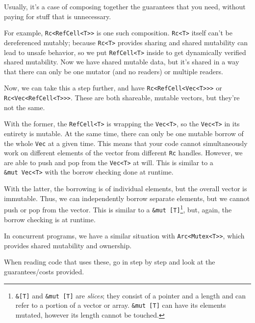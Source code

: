 \documentclass[a4paper,]{book}
\begin{document}
Usually, it's a case of composing together the guarantees that you need,
without paying for stuff that is unnecessary.

For example,
\texttt{Rc\textless{}RefCell\textless{}T\textgreater{}\textgreater{}} is
one such composition. \texttt{Rc\textless{}T\textgreater{}} itself can't
be dereferenced mutably; because \texttt{Rc\textless{}T\textgreater{}}
provides sharing and shared mutability can lead to unsafe behavior, so
we put \texttt{RefCell\textless{}T\textgreater{}} inside to get
dynamically verified shared mutability. Now we have shared mutable data,
but it's shared in a way that there can only be one mutator (and no
readers) or multiple readers.

Now, we can take this a step further, and have
\texttt{Rc\textless{}RefCell\textless{}Vec\textless{}T\textgreater{}\textgreater{}\textgreater{}}
or
\texttt{Rc\textless{}Vec\textless{}RefCell\textless{}T\textgreater{}\textgreater{}\textgreater{}}.
These are both shareable, mutable vectors, but they're not the same.

With the former, the \texttt{RefCell\textless{}T\textgreater{}} is
wrapping the \texttt{Vec\textless{}T\textgreater{}}, so the
\texttt{Vec\textless{}T\textgreater{}} in its entirety is mutable. At
the same time, there can only be one mutable borrow of the whole
\texttt{Vec} at a given time. This means that your code cannot
simultaneously work on different elements of the vector from different
\texttt{Rc} handles. However, we are able to push and pop from the
\texttt{Vec\textless{}T\textgreater{}} at will. This is similar to a
\texttt{\&mut\ Vec\textless{}T\textgreater{}} with the borrow checking
done at runtime.

With the latter, the borrowing is of individual elements, but the
overall vector is immutable. Thus, we can independently borrow separate
elements, but we cannot push or pop from the vector. This is similar to
a \texttt{\&mut\ {[}T{]}}\footnote{\texttt{\&{[}T{]}} and
  \texttt{\&mut\ {[}T{]}} are \emph{slices}; they consist of a pointer
  and a length and can refer to a portion of a vector or array.
  \texttt{\&mut\ {[}T{]}} can have its elements mutated, however its
  length cannot be touched.}, but, again, the borrow checking is at
runtime.

In concurrent programs, we have a similar situation with
\texttt{Arc\textless{}Mutex\textless{}T\textgreater{}\textgreater{}},
which provides shared mutability and ownership.

When reading code that uses these, go in step by step and look at the
guarantees/costs provided.
\end{document}

